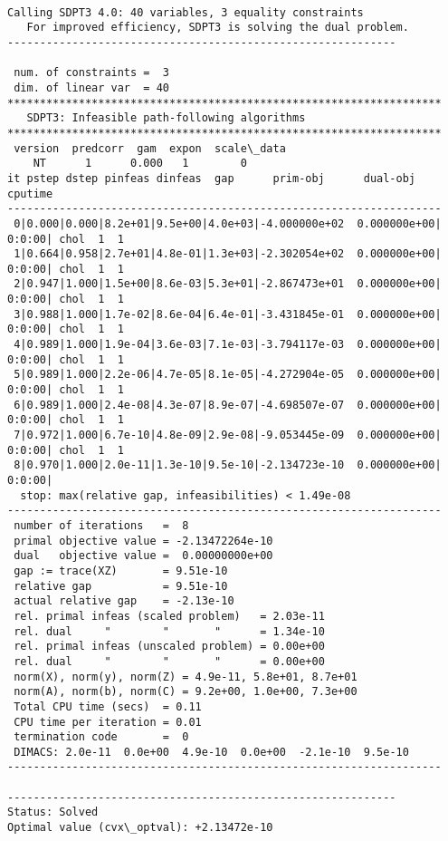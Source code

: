 \documentclass[11pt]{article}
\begin{document}
    \begin{Verbatim}[commandchars=\\\{\}]
 
Calling SDPT3 4.0: 40 variables, 3 equality constraints
   For improved efficiency, SDPT3 is solving the dual problem.
------------------------------------------------------------

 num. of constraints =  3
 dim. of linear var  = 40
*******************************************************************
   SDPT3: Infeasible path-following algorithms
*******************************************************************
 version  predcorr  gam  expon  scale\_data
    NT      1      0.000   1        0    
it pstep dstep pinfeas dinfeas  gap      prim-obj      dual-obj    cputime
-------------------------------------------------------------------
 0|0.000|0.000|8.2e+01|9.5e+00|4.0e+03|-4.000000e+02  0.000000e+00| 0:0:00| chol  1  1 
 1|0.664|0.958|2.7e+01|4.8e-01|1.3e+03|-2.302054e+02  0.000000e+00| 0:0:00| chol  1  1 
 2|0.947|1.000|1.5e+00|8.6e-03|5.3e+01|-2.867473e+01  0.000000e+00| 0:0:00| chol  1  1 
 3|0.988|1.000|1.7e-02|8.6e-04|6.4e-01|-3.431845e-01  0.000000e+00| 0:0:00| chol  1  1 
 4|0.989|1.000|1.9e-04|3.6e-03|7.1e-03|-3.794117e-03  0.000000e+00| 0:0:00| chol  1  1 
 5|0.989|1.000|2.2e-06|4.7e-05|8.1e-05|-4.272904e-05  0.000000e+00| 0:0:00| chol  1  1 
 6|0.989|1.000|2.4e-08|4.3e-07|8.9e-07|-4.698507e-07  0.000000e+00| 0:0:00| chol  1  1 
 7|0.972|1.000|6.7e-10|4.8e-09|2.9e-08|-9.053445e-09  0.000000e+00| 0:0:00| chol  1  1 
 8|0.970|1.000|2.0e-11|1.3e-10|9.5e-10|-2.134723e-10  0.000000e+00| 0:0:00|
  stop: max(relative gap, infeasibilities) < 1.49e-08
-------------------------------------------------------------------
 number of iterations   =  8
 primal objective value = -2.13472264e-10
 dual   objective value =  0.00000000e+00
 gap := trace(XZ)       = 9.51e-10
 relative gap           = 9.51e-10
 actual relative gap    = -2.13e-10
 rel. primal infeas (scaled problem)   = 2.03e-11
 rel. dual     "        "       "      = 1.34e-10
 rel. primal infeas (unscaled problem) = 0.00e+00
 rel. dual     "        "       "      = 0.00e+00
 norm(X), norm(y), norm(Z) = 4.9e-11, 5.8e+01, 8.7e+01
 norm(A), norm(b), norm(C) = 9.2e+00, 1.0e+00, 7.3e+00
 Total CPU time (secs)  = 0.11  
 CPU time per iteration = 0.01  
 termination code       =  0
 DIMACS: 2.0e-11  0.0e+00  4.9e-10  0.0e+00  -2.1e-10  9.5e-10
-------------------------------------------------------------------
 
------------------------------------------------------------
Status: Solved
Optimal value (cvx\_optval): +2.13472e-10
 


    \end{Verbatim}
\end{document}
